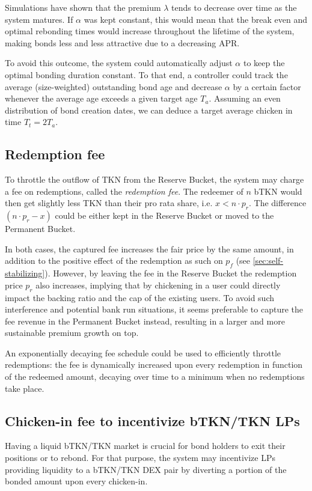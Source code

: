 \documentclass{article}
\begin{document}
Simulations have shown that the premium $\lambda$ tends to decrease over time as the system matures. If  $\alpha$ was kept constant, this would mean that the break even and optimal rebonding times would increase throughout the lifetime of the system, making bonds less and less attractive due to a decreasing APR.

To avoid this outcome, the system could automatically adjust $\alpha$ to keep the optimal bonding duration constant. To that end, a controller could track the average (size-weighted) outstanding bond age and decrease $\alpha$ by a certain factor whenever the average age exceeds a given target age $T_a$. Assuming an even distribution of bond creation dates, we can deduce a target average chicken in time $T_t = 2T_a$.

\subsection{Redemption fee}
  \label{sec:redemption-fee}
To throttle the outflow of TKN from the Reserve Bucket, the system may charge a fee on redemptions, called the \textit{redemption fee}. The redeemer of $n$ bTKN would then get slightly less TKN than their pro rata share, i.e. $x < n \cdot p_r$. The difference $(n \cdot p_r - x)$ could be either kept in the Reserve Bucket or moved to the Permanent Bucket. 

In both cases, the captured fee increases the fair price by the same amount, in addition to the positive effect of the redemption as such on $p_f$ (see \ref{sec:self-stabilizing}). However, by leaving the fee in the Reserve Bucket the redemption price $p_r$ also increases, implying that by chickening in a user could directly impact the backing ratio and the cap of the existing users. To avoid such interference and potential bank run situations, it seems preferable to capture the fee revenue in the Permanent Bucket instead, resulting in a larger and more sustainable premium growth on top.  

An exponentially decaying fee schedule could be used to efficiently throttle redemptions: the fee is dynamically increased upon every redemption in function of the redeemed amount, decaying over time to a minimum when no redemptions take place.

\subsection{Chicken-in fee to incentivize bTKN/TKN LPs}
  \label{sec:chicken-in-fee}
Having a liquid bTKN/TKN market is crucial for bond holders to exit their positions or to rebond.
For that purpose, the system may incentivize LPs providing liquidity to a bTKN/TKN DEX pair by diverting a portion of the bonded amount upon every chicken-in. 
\end{document}
